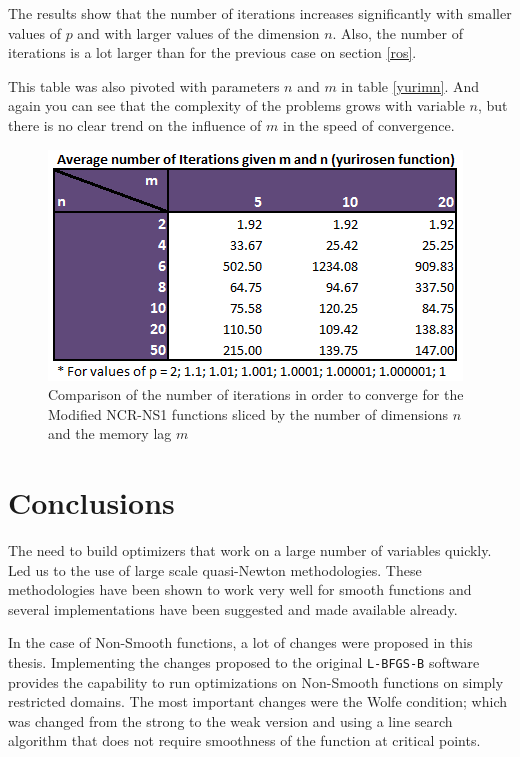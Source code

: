 The results show that the number of iterations increases significantly with smaller values of $p$ and with larger values of the dimension $n$. Also, the number of iterations is a lot larger than for the previous case on section \eqref{ros}. 

This table was also pivoted with parameters $n$ and $m$ in table \eqref{yurimn}. And again you can see that the complexity of the problems grows with variable $n$, but there is no clear trend on the influence of $m$ in the speed of convergence.

\begin{figure}
\begin{center}
\includegraphics[scale=0.9]{Figures/yurirosenmn.PNG}
\caption[Comparison of selected values of the Modified NCR-NS1 function pivoting by m and n parameters]{Comparison of the number of iterations in order to converge for the Modified NCR-NS1 functions sliced by the number of dimensions $n$ and the memory lag $m$}
\label{yurimn}
\end{center}
\end{figure} 

\chapter{Conclusions}

The need to build optimizers that work on a large number of variables quickly. Led us to the use of large scale quasi-Newton methodologies. These methodologies have been shown to work very well for smooth functions and several implementations have been suggested and made available already.

In the case of Non-Smooth functions, a lot of changes were proposed in this thesis. Implementing the changes proposed to the original \texttt{L-BFGS-B} software provides the capability to run optimizations on Non-Smooth functions on simply restricted domains. The most important changes were the Wolfe condition; which was changed from the strong to the weak version and using a line search algorithm that does not require smoothness of the function at critical points.


